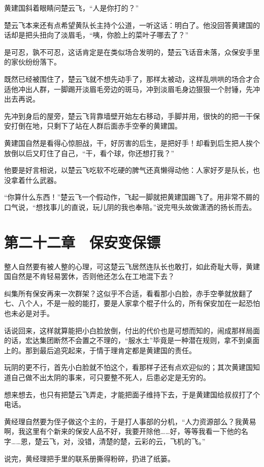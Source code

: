 黄建国斜着眼睛问楚云飞，“人是你打的？”

楚云飞本来还有点希望黄队长主持个公道，一听这话：明白了。他没回答黄建国的话却是把头扭向了淡眉毛，“咦，你脸上的菜叶子哪去了？”

是可忍，孰不可忍，这话肯定是在类似场合发明的，楚云飞话音未落，众保安手里的家伙纷纷落下。

既然已经被围住了，楚云飞就不想先动手了，那样太被动，这样乱哄哄的场合才合适他冲出人群，一脚踢开淡眉毛旁边的斑马，冲到淡眉毛身边狠狠一个肘锤，先冲出去再说。

先冲到身后的屋旁，楚云飞背靠墙壁开始左右移动，手脚并用，很快的的把一干保安打倒在地，只剩下了站在人群后面赤手空拳的黄建国。

黄建国自然是看得心惊胆战，干，好厉害的后生，是把好手！却看到后生把人挨个放倒以后又盯住了自己，“干，看个球，你还想打我？”

他要是好言相说，以楚云飞吃软不吃硬的脾气还真懒得动他：人家好歹是队长，也没拿着什么武器。

“你算什么东西！”楚云飞一个假动作，飞起一脚就把黄建国踢飞了。用非常不屑的口气说，“想找事儿的直说，玩儿阴的我也奉陪。”说完甩头故做潇洒的扬长而去。

\section{第二十二章　保安变保镖}

整人自然要有被人整的心理，可这楚云飞居然连队长也敢打，如此奇耻大辱，黄建国自然是不肯轻易罢休，否则他还怎么在工地混下去？

纠集所有保安再来一次群架？这似乎不合适，看看那小白脸，赤手空拳就放翻了七、八个人，不是一般的能打，要是人家拿个棍子什么的，所有保安加在一起恐怕也未必是对手。

话说回来，这样就算能把小白脸放倒，付出的代价也是可想而知的，闹成那样局面的话，宏达集团断然不会置之不理的，“服水土”毕竟是一种潜在规则，拿不到桌面上的。那到最后追究起来，于情于理肯定都是黄建国的责任。

玩阴的更不行，首先小白脸就不怕这个，看那样子还有点欢迎似的；其次黄建国知道自己做不出太阴的事来，可只要整不死人，后患必定是无穷的。

想来想去，也只有把楚云飞弄走，才能把面子维持下去，于是黄建国给叔叔打了个电话。

黄经理自然要为侄子做这个主的，于是打人事部的分机，“人力资源部么？我黄易啊，我这里有个新来的保安人品不好，我要开除他……好，等等我看一下他的名字……恩，楚云飞，对，没错，清楚的楚，云彩的云，飞机的飞。”

说完，黄经理把手里的联系册撕得粉碎，扔进了纸篓。

